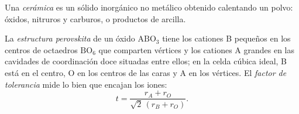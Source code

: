 \begin{definition}[Cerámica]\label{def:b3:inorganic-materials:ceramic}
Una \emph{cerámica} es un sólido inorgánico no metálico obtenido
calentando un polvo: óxidos, nitruros y carburos, o productos de arcilla.
\end{definition}

\begin{definition}\label{def:b3:inorganic-materials:perovskite}
La \emph{estructura perovskita} de un óxido $\mathrm{ABO_3}$
tiene los cationes B pequeños en los centros de octaedros $\mathrm{BO_6}$ que comparten vértices y
los cationes A grandes en las cavidades de coordinación doce situadas entre ellos; en la
celda cúbica ideal, B está en el centro, O en los centros de las caras y A en los vértices.
El \emph{factor de tolerancia} mide lo bien que encajan
los iones:
\[
  t = \frac{r_A + r_O}{\sqrt2\,(r_B + r_O)}.
\]
\end{definition}

